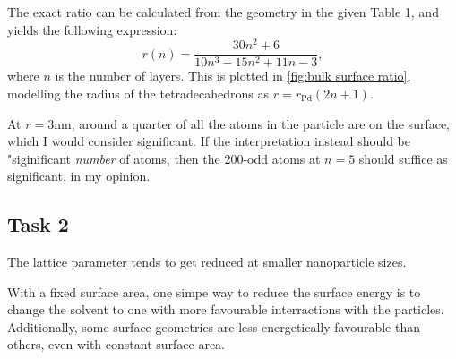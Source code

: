     The exact ratio can be calculated from the geometry in the given Table 1,
    and yields the following expression:
    $$
    r(n) = \frac{30n^2 + 6}{10n^3 -15n^2 + 11n -3},
    $$
    where $n$ is the number of layers. 
    This is plotted in \autoref{fig:bulk surface ratio}, 
    modelling the radius of the tetradecahedrons as 
    $r = r_\text{Pd}\left(2n + 1\right)$.

    At $r = 3\si{\nano\metre}$, around a quarter of 
    all the atoms in the particle are on the surface, which I
    would consider significant. If the interpretation instead should
    be "siginificant \textit{number} of atoms, then the 200-odd atoms at 
    $n = 5$ should suffice as significant, in my opinion.

\subsection*{Task 2}
    The lattice parameter tends to get reduced at smaller nanoparticle
    sizes. 

    With a fixed surface area, one simpe way to reduce the surface
    energy is to change the solvent to one with more favourable 
    interractions with the particles. Additionally, some surface 
    geometries are less energetically favourable than others, 
    even with constant surface area. 
    
